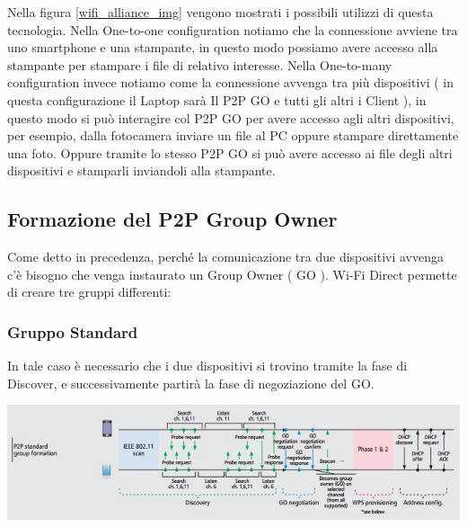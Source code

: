 Nella figura  \ref{wifi_alliance_img} vengono mostrati i possibili utilizzi di questa tecnologia.
Nella One-to-one configuration notiamo che la connessione avviene tra uno smartphone e una stampante, in questo modo possiamo avere accesso alla stampante per stampare i file di relativo interesse.
Nella One-to-many configuration invece notiamo come la connessione avvenga tra più dispositivi ( in questa configurazione il Laptop sarà Il P2P GO e tutti gli altri i Client ), in questo modo si può interagire col P2P GO per avere accesso agli altri dispositivi, per esempio, dalla fotocamera inviare un file al PC oppure stampare direttamente una foto.
Oppure tramite lo stesso P2P GO si può avere accesso ai file degli altri dispositivi e stamparli inviandoli alla stampante.

\subsection{Formazione del P2P Group Owner}

Come detto in precedenza, perché la comunicazione tra due dispositivi avvenga c’è bisogno che venga instaurato un Group Owner ( GO ).
Wi-Fi Direct permette di creare tre gruppi differenti:

\subsubsection{Gruppo Standard}

In tale caso è necessario che i due dispositivi si trovino tramite la fase di Discover, e successivamente partirà la fase di negoziazione del GO.

\begin{center}
\includegraphics[width=1\textwidth]{imgs/Standard_Group.jpg}
\label{standard_group_img}%
\end{center}

